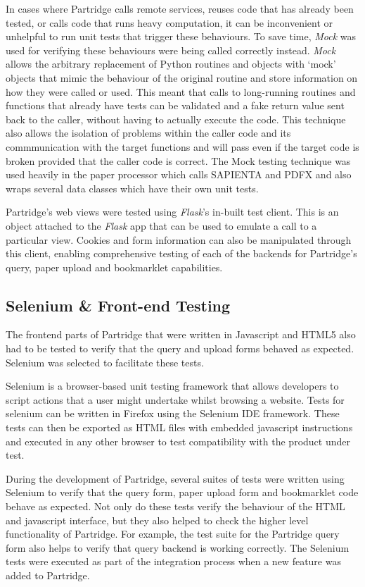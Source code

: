 In cases where Partridge calls remote services, reuses code that has already
been tested, or calls code that runs heavy computation, it can be inconvenient
or unhelpful to run unit tests that trigger these behaviours. To save time,
\emph{Mock}\cite{mock2013} was used for verifying these behaviours were being
called correctly instead.  \emph{Mock} allows the arbitrary replacement of
Python routines and objects with `mock' objects that mimic the behaviour of the
original routine and store information on how they were called or used. This
meant that calls to long-running routines and functions that already have tests
can be validated and a fake return value sent back to the caller, without
having to actually execute the code. This technique also allows the isolation
of problems within the caller code and its commmunication with the target
functions and will pass even if the target code is broken provided that the
caller code is correct\cite{saff2004mock}. The Mock testing technique was used
heavily in the paper processor which calls SAPIENTA and PDFX and also wraps
several data classes which have their own unit tests.

Partridge's web views were tested using \emph{Flask}'s in-built test client.
This is an object attached to the \emph{Flask} app that can be used to emulate
a call to a particular view\cite{flask2012}. Cookies and form information can also be
manipulated through this client, enabling comprehensive testing of each of the backends
for Partridge's query, paper upload and bookmarklet capabilities.


\subsection{ Selenium \& Front-end Testing }

The frontend parts of Partridge that were written in Javascript and HTML5 also
had to be tested to verify that the query and upload forms behaved as expected.
Selenium\cite{seleniumide} was selected to facilitate these tests.

Selenium is a browser-based unit testing framework that allows developers to
script actions that a user might undertake whilst browsing a website. Tests for
selenium can be written in Firefox using the Selenium IDE framework. These
tests can then be exported as HTML files with embedded javascript instructions
and executed in any other browser to test compatibility with the product under
test.

During the development of Partridge, several suites of tests were written using
Selenium to verify that the query form, paper upload form and bookmarklet code
behave as expected. Not only do these tests verify the behaviour of the HTML
and javascript interface, but they also helped to check the higher level
functionality of Partridge. For example, the test suite for the Partridge query
form also helps to verify that query backend is working correctly. The Selenium
tests were executed as part of the integration process when a new feature was
added to Partridge.



